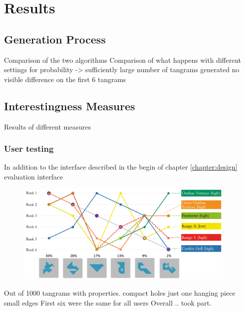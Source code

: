 \chapter{Results}\label{chapter:results}

\section{Generation Process}

Comparison of the two algorithms
Comparison of what happens with different settings for probability -> sufficiently large number of tangrams generated no visible difference on the first 6 tangrams

\section{Interestingness Measures}

Results of different measures

\subsection{User testing}

In addition to the interface described in the begin of chapter \ref{chapter:design} evaluation interface 
\begin{figure}
\centering
    \includegraphics[width=0.95\textwidth]{figures/diagram.png}
  \caption{}  
  \label{result}
\end{figure}

Out of 1000 tangrams
with properties. 
compact
holes
just one hanging piece
small edges
First six were the same for all users
Overall .. took part. 
